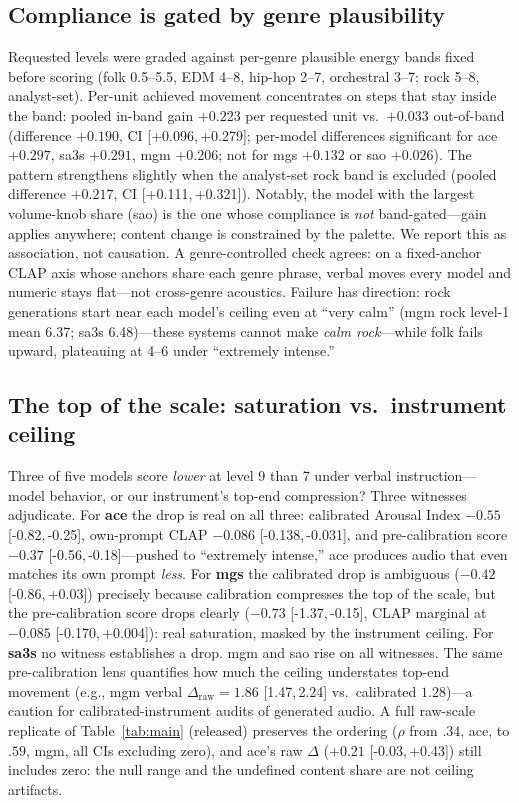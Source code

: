 \documentclass{article}
\newcommand{\ci}[2]{[#1,\,#2]}
\newcommand{\inst}{Arousal Index}
\begin{document}
\subsection{Compliance is gated by genre plausibility}
\label{sec:bands}

Requested levels were graded against per-genre plausible energy bands fixed
before scoring (folk 0.5--5.5, EDM 4--8, hip-hop 2--7, orchestral 3--7;
rock 5--8, analyst-set). Per-unit achieved movement concentrates on steps
that stay inside the band: pooled in-band gain $+0.223$ per requested unit
vs.\ $+0.033$ out-of-band (difference $+0.190$, CI \ci{+0.096}{+0.279};
per-model differences significant for ace $+0.297$, sa3s $+0.291$, mgm
$+0.206$; not for mgs $+0.132$ or sao $+0.026$). The pattern strengthens slightly
when the analyst-set rock band is excluded (pooled difference $+0.217$,
CI \ci{+0.111}{+0.321}).
Notably, the model with the largest volume-knob share (sao) is the one whose
compliance is \emph{not} band-gated---gain applies anywhere; content
change is constrained by the palette. We report this as association, not causation. A genre-controlled
check agrees: on a fixed-anchor CLAP axis whose anchors share each genre
phrase, verbal moves every model and numeric stays flat---not cross-genre
acoustics.
Failure has direction: rock generations start near each model's ceiling even
at ``very calm'' (mgm rock level-1 mean 6.37; sa3s 6.48)---these systems
cannot make \emph{calm rock}---while folk fails upward, plateauing at 4--6
under ``extremely intense.''

\subsection{The top of the scale: saturation vs.\ instrument ceiling}
\label{sec:droop}

Three of five models score \emph{lower} at level 9 than 7 under verbal
instruction---model behavior, or our instrument's top-end compression? Three
witnesses adjudicate. For \textbf{ace} the drop is real on
all three: calibrated \inst{} $-0.55$ \ci{-0.82}{-0.25}, own-prompt CLAP
$-0.086$ \ci{-0.138}{-0.031}, and pre-calibration score $-0.37$
\ci{-0.56}{-0.18}---pushed to ``extremely intense,'' ace produces audio that
even matches its own prompt \emph{less}. For \textbf{mgs} the calibrated drop
is ambiguous ($-0.42$ \ci{-0.86}{+0.03}) precisely because calibration
compresses the top of the scale, but the pre-calibration score drops clearly
($-0.73$ \ci{-1.37}{-0.15}, CLAP marginal at $-0.085$ \ci{-0.170}{+0.004}):
real saturation, masked by the instrument ceiling. For \textbf{sa3s} no
witness establishes a drop. mgm and sao rise on all witnesses. The same
pre-calibration lens quantifies how much the ceiling understates top-end
movement (e.g., mgm verbal $\Delta_{\text{raw}}{=}1.86$ \ci{1.47}{2.24}
vs.\ calibrated $1.28$)---a caution for calibrated-instrument audits of generated audio. A full raw-scale replicate of Table~\ref{tab:main}
(released) preserves the ordering ($\rho$ from $.34$, ace, to $.59$, mgm,
all CIs excluding zero), and ace's raw $\Delta$ ($+0.21$ \ci{-0.03}{+0.43})
still includes zero: the null range and the undefined content share are not
ceiling artifacts.
\end{document}
